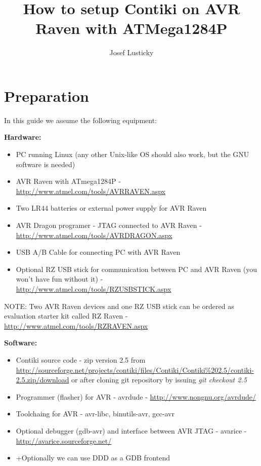 \documentclass{article}
\begin{document}
\title{How to setup Contiki on AVR Raven with ATMega1284P}
\author{Josef Lusticky}

\maketitle

\section{Preparation}
In this guide we assume the following equipment:

\vspace{0.2cm}

{\textbf{Hardware:}}
\begin{itemize}
	\item PC running Linux (any other Unix-like OS should also work, but the GNU software is needed)
	\item AVR Raven with ATmega1284P - \url{http://www.atmel.com/tools/AVRRAVEN.aspx}
	\item Two LR44 batteries or external power supply for AVR Raven
	\item AVR Dragon programer - JTAG connected to AVR Raven - \url{http://www.atmel.com/tools/AVRDRAGON.aspx}
	\item USB A/B Cable for connecting PC with AVR Raven
	\item Optional RZ USB stick for communication between PC and AVR Raven
	(you won't have fun without it) - \url{http://www.atmel.com/tools/RZUSBSTICK.aspx}
\end{itemize}

NOTE: Two AVR Raven devices and one RZ USB stick can be ordered as
evaluation starter kit called RZ Raven - \url{http://www.atmel.com/tools/RZRAVEN.aspx}




\vspace{0.5cm}

{\textbf{Software:}}
\begin{itemize}
	\item Contiki source code - zip version 2.5 from\\
	\url{http://sourceforge.net/projects/contiki/files/Contiki/Contiki%202.5/contiki-2.5.zip/download}
	or after cloning git repository by issuing {\it{git checkout 2.5}}
	\item Programmer (flasher) for AVR - avrdude - \url{http://www.nongnu.org/avrdude/}
	\item Toolchaing for AVR - avr-libc, binutils-avr, gcc-avr
	\item Optional debugger (gdb-avr) and interface between AVR JTAG - avarice - \url{http://avarice.sourceforge.net/}
	\item +Optionally we can use DDD as a GDB frontend
\end{itemize}
\end{document}
